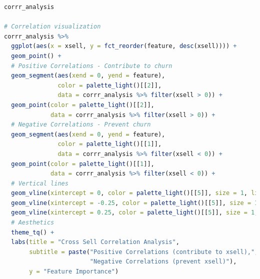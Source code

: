 \begin{lstlisting}[language=R,caption={Tensorflow Model}, label=lst:tensorflow]
corrr_analysis

# Correlation visualization
corrr_analysis %>%
  ggplot(aes(x = xsell, y = fct_reorder(feature, desc(xsell)))) +
  geom_point() +
  # Positive Correlations - Contribute to churn
  geom_segment(aes(xend = 0, yend = feature), 
               color = palette_light()[[2]], 
               data = corrr_analysis %>% filter(xsell > 0)) +
  geom_point(color = palette_light()[[2]], 
             data = corrr_analysis %>% filter(xsell > 0)) +
  # Negative Correlations - Prevent churn
  geom_segment(aes(xend = 0, yend = feature), 
               color = palette_light()[[1]], 
               data = corrr_analysis %>% filter(xsell < 0)) +
  geom_point(color = palette_light()[[1]], 
             data = corrr_analysis %>% filter(xsell < 0)) +
  # Vertical lines
  geom_vline(xintercept = 0, color = palette_light()[[5]], size = 1, linetype = 2) +
  geom_vline(xintercept = -0.25, color = palette_light()[[5]], size = 1, linetype = 2) +
  geom_vline(xintercept = 0.25, color = palette_light()[[5]], size = 1, linetype = 2) +
  # Aesthetics
  theme_tq() +
  labs(title = "Cross Sell Correlation Analysis",
       subtitle = paste("Positive Correlations (contribute to xsell),",
                        "Negative Correlations (prevent xsell)"),
       y = "Feature Importance")

\end{lstlisting}